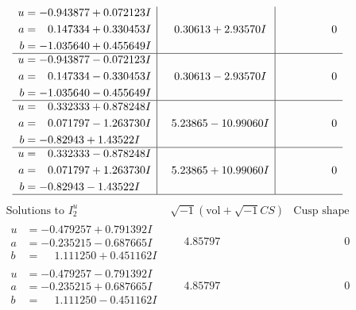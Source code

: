 \documentclass[1p]{elsarticle_modified}
\theoremstyle{definition}
\newcommand{\I}{\sqrt{-1}}
\begin{document}
$$\begin{array}{c|c|c}
\begin{aligned}
u &= -0.943877 + 0.072123 I \\
a &= \phantom{-}0.147334 + 0.330453 I \\
b &= -1.035640 + 0.455649 I\end{aligned}
 & \phantom{-}0.30613 + 2.93570 I & \phantom{-0.000000 } 0 \\ \hline\begin{aligned}
u &= -0.943877 - 0.072123 I \\
a &= \phantom{-}0.147334 - 0.330453 I \\
b &= -1.035640 - 0.455649 I\end{aligned}
 & \phantom{-}0.30613 - 2.93570 I & \phantom{-0.000000 } 0 \\ \hline\begin{aligned}
u &= \phantom{-}0.332333 + 0.878248 I \\
a &= \phantom{-}0.071797 - 1.263730 I \\
b &= -0.82943 + 1.43522 I\end{aligned}
 & \phantom{-}5.23865 - 10.99060 I & \phantom{-0.000000 } 0 \\ \hline\begin{aligned}
u &= \phantom{-}0.332333 - 0.878248 I \\
a &= \phantom{-}0.071797 + 1.263730 I \\
b &= -0.82943 - 1.43522 I\end{aligned}
 & \phantom{-}5.23865 + 10.99060 I & \phantom{-0.000000 } 0\\
 \hline 
 \end{array}$$\newpage$$\begin{array}{c|c|c}  
\text{Solutions to }I^u_{2}& \I (\text{vol} + \sqrt{-1}CS) & \text{Cusp shape}\\
 \hline 
\begin{aligned}
u &= -0.479257 + 0.791392 I \\
a &= -0.235215 - 0.687665 I \\
b &= \phantom{-}1.111250 + 0.451162 I\end{aligned}
 & \phantom{-}4.85797\phantom{ +0.000000I} & \phantom{-0.000000 } 0 \\ \hline\begin{aligned}
u &= -0.479257 - 0.791392 I \\
a &= -0.235215 + 0.687665 I \\
b &= \phantom{-}1.111250 - 0.451162 I\end{aligned}
 & \phantom{-}4.85797\phantom{ +0.000000I} & \phantom{-0.000000 } 0 \\ \hline\begin{aligned}

\end{aligned}
\end{array}$$
\end{document}
